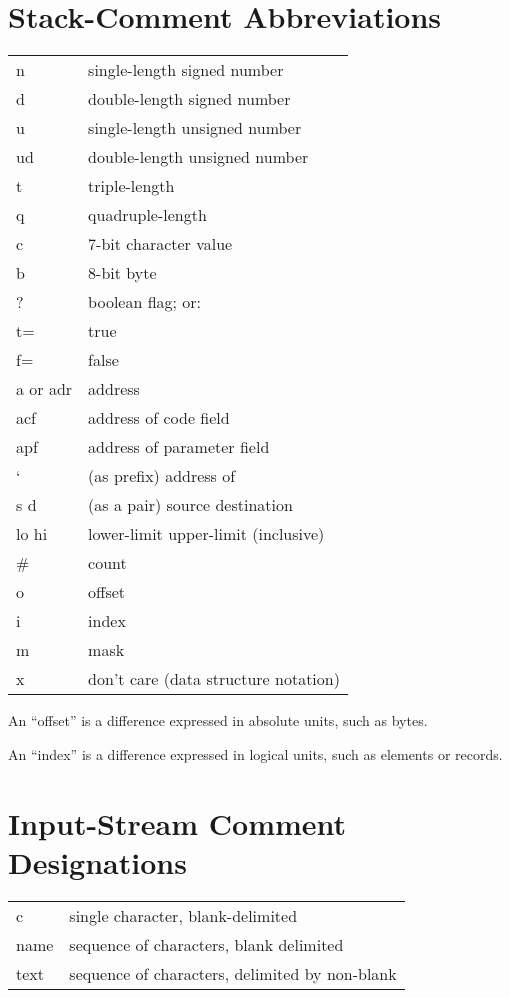 \section{Stack-Comment Abbreviations}
\begin{tabular}{ll}
{}{\setlength{\parsep}{0cm}}n&single-length signed number\\
d&double-length signed number\\
u&single-length unsigned number\\
ud&double-length unsigned number\\
t&triple-length\\
q&quadruple-length\\
c&7-bit character value\\
b&8-bit byte\\
?&boolean flag; or:\\
t=&true\\
f=&false\\
a or adr&address\\
acf&address of code field\\
apf&address of parameter field\\
`&(as prefix) address of\\
s d&(as a pair) source destination\\
lo hi&lower-limit upper-limit (inclusive)\\
\#&count\\
o&offset\\
i&index\\
m&mask\\
x&don't care (data structure notation)\\
\end{tabular}

An ``offset'' is a difference expressed in absolute units, such as bytes.

An ``index'' is a difference expressed in logical units, such as
elements or records.

\section{Input-Stream Comment Designations}
\begin{tabular}{ll}
{}{\setlength{\parsep}{0cm}}c&single character, blank-delimited\\
name&sequence of characters, blank delimited\\
text&sequence of characters, delimited by non-blank\\
\end{tabular}

